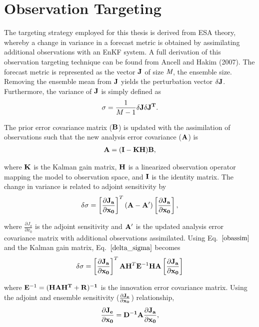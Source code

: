 \documentclass{ttuthes2007}
\newcommand{\tab}{\hspace*{2em}}  %
\begin{document}
\section{Observation Targeting}

\tab The targeting strategy employed for this thesis is derived from ESA theory, whereby a change in variance in a forecast metric is obtained by assimilating additional observations with an EnKF system. A full derivation of this observation targeting technique can be found from Ancell and Hakim (2007). The forecast metric is represented as the vector $\bf{J}$ of size $\emph{M}$, the ensemble size. Removing the ensemble mean from $\bf{J}$ yields the perturbation vector $\delta\bf{J}$. Furthermore, the variance of $\bf{J}$ is simply defined as
\begin{align}\label{J_var}
	\sigma = \frac{1}{M-1} \delta\bf{J} \delta{\mathbf{J}}^T.
\end{align}

The prior error covariance matrix ($\bf{B}$) is updated with the assimilation of observations such that the new analysis error covariance ($\bf{A}$) is
\begin{align}\label{obassim}
	\bf{A} = (\bf{I} - \bf{K}\bf{H})\bf{B},
\end{align}

where $\bf{K}$ is the Kalman gain matrix, $\bf{H}$ is a linearized observation operator mapping the model to observation space, and $\bf{I}$ is the identity matrix. The change in variance is related to adjoint sensitivity by
\begin{align}\label{delta_sigma}
	\delta \sigma = \left[ \frac{\partial \bf{J_a}}{\partial \bf{x_0}} \right]^T (\mathbf{A} - \mathbf{A'}) \left[  \frac{\partial \bf{J_a}}{\partial \mathbf{x_0}}\right],
\end{align}

where $ \frac{\partial J_a}{\partial x_0}$ is the adjoint sensitivity and $\bf{A'}$ is the updated analysis error covariance matrix with additional observations assimilated. Using Eq.~$\ref{obassim}$ and the Kalman gain matrix, Eq.~$\ref{delta_sigma}$ becomes
\begin{align}
	\delta \sigma = \left[ \frac{\partial \bf{J_a}}{\partial \bf{x_0}} \right]^T \mathbf{A}\mathbf{H}^T\mathbf{E}^{-1}\mathbf{H}\mathbf{A}  \left[  \frac{\partial \bf{J_a}}{\partial \mathbf{x_0}}\right]
\end{align}

where $\mathbf{E}^{-1} = (\bf{H}\bf{A}\bf{H}^T + R)^{-1}$ is the innovation error covariance matrix. Using the adjoint and ensemble sensitivity ($\frac{\partial \bf{J_e}}{\partial \bf{x_0}}$) relationship, 
\begin{align}
	\frac{\partial \bf{J_e}}{\partial \bf{x_0}} = \bf{D}^{-1}\bf{A} \frac{\partial J_a}{\partial x_0}, 
\end{align}
\end{document}
